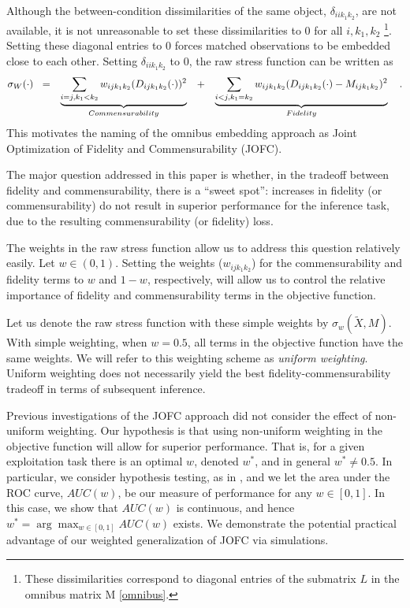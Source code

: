 \documentclass[12pt]{article} %
\begin{document}
Although  the between-condition dissimilarities of the same object, ${ \delta_{iik_1k_2}}$, are not available,  it is not unreasonable to set these dissimilarities to $0$ for all $i,k_1,k_2$ \footnote{These dissimilarities correspond to  diagonal  entries of the  submatrix $L$ in  the omnibus matrix  M \eqref{omnibus}. }. Setting these diagonal entries to $0$ forces matched observations to be embedded close to each other. Setting $\delta_{iik_1k_2}$ to $0$, the raw stress function can be written as
\begin{align}
\sigma_W(\cdot)\hspace{3pt}   
\hspace{3pt}&=&\underbrace{\sum_{i=j,k_1< k_2}  {w_{ij{k_1}{k_2}}(D_{ij{k_1}{k_2}}(\cdot))^2}}_{Commensurability}  \hspace{10pt}  &  +&\underbrace{\sum_{i< j,k_1=k_2}  {w_{ij{k_1}{k_2}}(D_{ij{k_1}{k_2}}(\cdot)-M_{ijk_1k_2})^2  }  } _{Fidelity}\notag\label{eq:FidCommSep}\hspace{10pt} .
\end{align}
This motivates  the naming of the   omnibus embedding approach as Joint Optimization of Fidelity and Commensurability (JOFC).


The major question  addressed in this paper is whether, in the tradeoff between fidelity and commensurability, there is a ``sweet spot'':  increases in fidelity (or commensurability) do not result in superior performance for  the inference task, due to the resulting commensurability (or fidelity) loss. 

 The weights in the raw stress function allow us to address this question relatively easily. Let $w \in (0,1)$. Setting the weights ($w_{ijk_1k_2}$)  for the commensurability  and fidelity  terms    to $w$ and $1-w$, respectively,  will allow us to control the relative importance of fidelity and commensurability terms in the objective function.

 Let us denote the raw stress function with these simple weights by $\sigma_w(\widetilde{X},M)$. With simple weighting, when $w=0.5$, all terms in the objective function have the same weights. We will refer to this weighting scheme as \emph{uniform weighting}. Uniform weighting does not necessarily yield the best fidelity-commensurability tradeoff in terms of subsequent inference. 

 Previous investigations of the JOFC approach \cite{JOFC} did not consider the effect of non-uniform weighting.
Our hypothesis is that using non-uniform weighting  in the objective function will allow for superior performance.
That is, for a given exploitation task there is an optimal $w$, denoted $w^*$, and in general $w^* \neq 0.5$.
In particular, we consider hypothesis testing, as in \cite{JOFC},
and we let the area under the ROC curve, $AUC(w)$, be our measure of performance for any $w \in [0,1]$.
In this case, we show that $AUC(w)$ is continuous, and hence $w^* = \arg\max_{w \in [0,1]} AUC(w)$ exists.
We demonstrate the potential practical advantage of our weighted generalization of JOFC via simulations.
\end{document}

